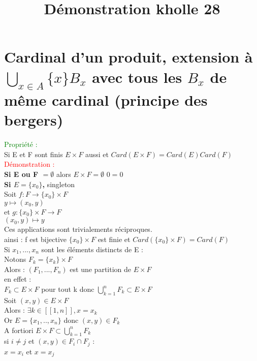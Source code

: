 \documentclass{article}
\begin{document}
\title{Démonstration kholle 28}
\date{}
\maketitle
\renewcommand{\thesection}{\Roman{section}}
\setlength{\parindent}{1.5cm}
\section{Cardinal d'un produit, extension à $\bigcup_{x\in A} \lbrace x \rbrace B_x$ avec tous les $B_x$ de  même cardinal (principe des bergers)}
\textcolor{green}{Propriété :} \\
Si E et F sont finis $E \times F $ aussi et $Card(E \times F)= Card(E) Card(F)$ \\
\textcolor{red}{Démonstration :} \\
{\bf \boldmath Si E ou F $= \emptyset$} alors $E \times F= \emptyset$ $0=0$ \\
{\bf \boldmath Si $E= \lbrace x_0 \rbrace$,} singleton \\
Soit $f: F \rightarrow \lbrace x_0 \rbrace \times F $ \\
$y \mapsto (x_0,y)$ \\
et $g : \lbrace x_0 \rbrace \times F \rightarrow F$ \\
$(x_0,y) \mapsto y$ \\
Ces applications sont trivialements réciproques. \\
ainsi : f est bijective $\lbrace x_0 \rbrace \times F$ est finie et $Card(\lbrace x_0 \rbrace \times F)= Card(F) $ \\
Si $x_1,..., x_n$ sont les éléments distincts de E : \\
Notons $F_k= \lbrace x_k \rbrace \times F$ \\
Alors : $(F_1,...,F_n)$ est une partition de $E \times F$ \\
en effet : \\
$F_k \subset E \times F$ pour tout k donc $\bigcup_{k=1}^n F_k \subset E \times F$ \\
Soit $(x,y) \in E \times F$ \\
Alors : $\exists k \in [[1,n]],x=x_k$ \\
Or $E= \lbrace x_1,..,x_n \rbrace $ donc $(x,y) \in F_k$ \\
A fortiori  $E \times F \subset \bigcup_{k=1}^n F_k$ \\
si $i \neq j$ et $(x,y) \in F_i \cap F_j$ : \\
$x=x_i$ et $x=x_j$ \\
\end{document}
